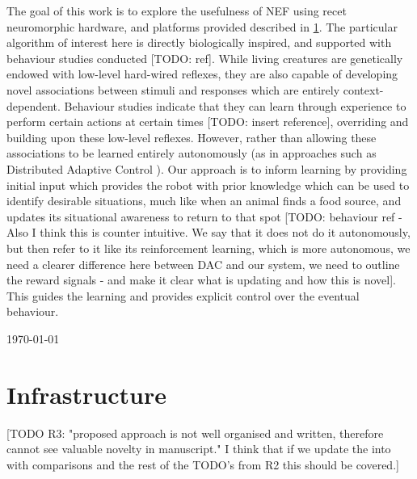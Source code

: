 \documentclass[conference]{IEEEtran}
\begin{document}
The goal of this work is to explore the usefulness of NEF using recet neuromorphic hardware, and platforms provided described in \ref{infrastructure}. The particular algorithm of interest here is directly biologically inspired, and supported with behaviour studies conducted [TODO: ref]. While living creatures are genetically endowed with low-level hard-wired reflexes, they are also capable of developing novel associations between stimuli and responses which are entirely context-dependent. Behaviour studies indicate that they can learn through experience to perform certain actions at certain times [TODO: insert reference], overriding and building upon these low-level reflexes. However, rather than allowing these associations to be learned entirely autonomously (as in approaches such as Distributed Adaptive Control \cite{verschure2012distributed}). Our approach is to inform learning by providing initial input which provides the robot with prior knowledge which can be used to identify desirable situations, much like when an animal finds a food source, and updates its situational awareness to return to that spot [TODO: behaviour ref - Also I think this is counter intuitive. We say that it does not do it autonomously, but then refer to it like its reinforcement learning, which is more autonomous, we need a clearer difference here between DAC and our system, we need to outline the reward signals - and make it clear what is updating and how this is novel]. This guides the learning and provides explicit control over the eventual behaviour. 

\hfill \today

\section{Infrastructure}
\label{infrastructure}

[TODO R3: "proposed approach is not well organised and written, therefore cannot see valuable novelty in manuscript." I think that if we update the into with comparisons and the rest of the TODO's from R2 this should be covered.]
\end{document}

